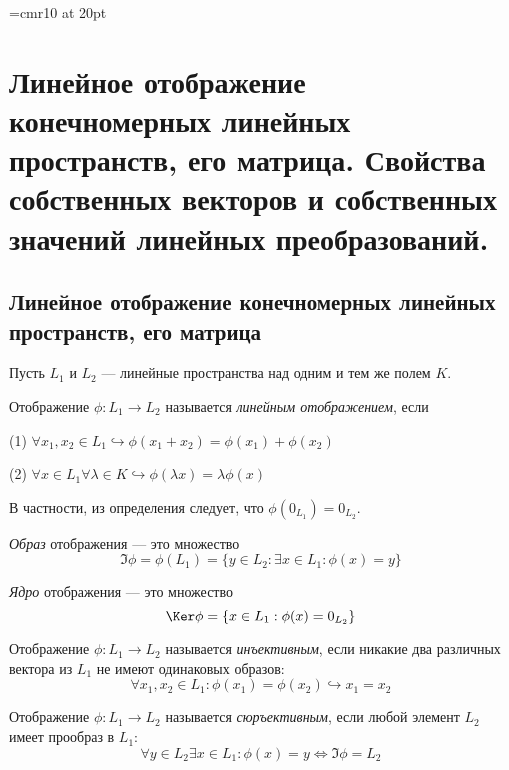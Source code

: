 \font\Large=cmr10 at 20pt
\def\fudge#1{\smash{\hbox{\Large#1}}}
\chapter[Линейное отображение конечномерных линейных прост\-ранств, его матрица. Свойства собственных векторов и собственных значений линейных преобразований.]{Линейное отображение конечномерных линейных пространств, его матрица. Свойства собственных векторов и собственных значений линейных преобразований.}
\section{Линейное отображение конечномерных линейных пространств, его матрица}
  Пусть $L_1$ и $L_2$ --- линейные пространства над одним  и тем же полем $K$.
  \begin{defn}
  Отображение $\phi: L_1\rightarrow L_2$ называется \textit{линейным отображением}, если
  
  (1) $\forall x_1,x_2 \in L_1 \hookrightarrow \phi(x_1+x_2)=\phi(x_1)+\phi(x_2)$
  
  (2) $\forall x \in L_1 \forall \lambda \in K \hookrightarrow \phi(\lambda x)=\lambda \phi(x)$
  \end{defn}
  В частности, из определения следует, что $\phi(0_{L_1})=0_{L_2}$.
  \begin{defn}
    \textit{Образ} отображения --- это множество 
    \begin{equation}
    \Im\phi=\phi(L_1)=\{y\in L_2: \exists x\in L_1: \phi(x)=y\}
    \end{equation}
  \end{defn}
  \begin{defn}
    \textit{Ядро} отображения --- это множество 
    \begin{equation}
    \Ker\phi=\{x\in L_1: \phi(x)=0_{L_2}\}
    \end{equation}
  \end{defn}
  \begin{defn}
  Отображение $\phi: L_1\rightarrow L_2$ называется \textit{инъективным}, если никакие два различных вектора из $L_1$ не имеют одинаковых образов:
  \begin{equation}\label{22.1.inject}
    \forall x_1,x_2 \in L_1: \phi(x_1)=\phi(x_2) \hookrightarrow x_1=x_2
  \end{equation}
  \end{defn}  
  \begin{defn}
  Отображение $\phi: L_1\rightarrow L_2$ называется \textit{сюръективным}, если любой элемент $L_2$ имеет прообраз в $L_1$:
  \begin{equation}\label{22.1.surject}
    \forall y \in L_2 \exists x \in L_1: \phi(x)=y \Leftrightarrow \Im \phi = L_2
  \end{equation}
  \end{defn}  
  
